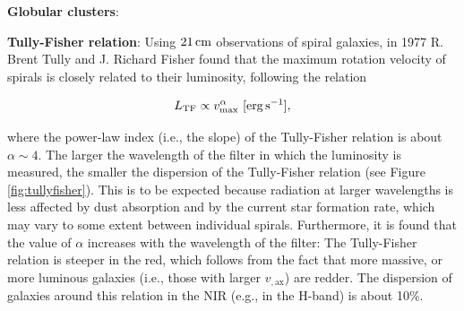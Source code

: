 \documentclass[a4paper,11pt]{article}
\begin{document}
{\noindent}\textbf{Globular clusters}: 

{\noindent}\textbf{Tully-Fisher relation}: Using $21\,{\rm cm}$ observations of spiral galaxies, in 1977 R. Brent Tully and J. Richard Fisher found that the maximum rotation velocity of spirals is closely related to their luminosity, following the relation

\begin{align*}
    L_\mathrm{TF} \propto v_\mathrm{max}^\alpha ~ [{\rm erg\,s^{-1}}],
\end{align*}

{\noindent}where the power-law index (i.e., the slope) of the Tully-Fisher relation is about $\alpha\sim4$. The larger the wavelength of the filter in which the luminosity is measured, the smaller the dispersion of the Tully-Fisher relation (see Figure \ref{fig:tullyfisher}). This is to be expected because radiation at larger wavelengths is less affected by dust absorption and by the current star formation rate, which may vary to some extent between individual spirals. Furthermore, it is found that the value of $\alpha$ increases with the wavelength of the filter: The Tully-Fisher relation is steeper in the red, which follows from the fact that more massive, or more luminous galaxies (i.e., those with larger $v_\mathrm{,ax}$) are redder. The dispersion of galaxies around this relation in the NIR (e.g., in the H-band) is about 10\%.
\end{document}
